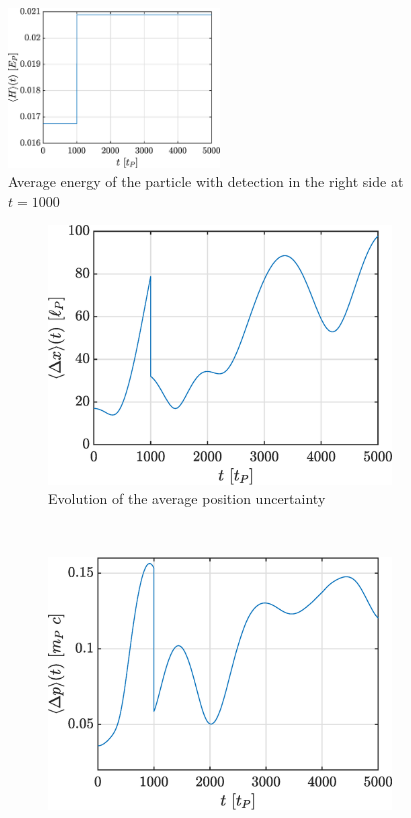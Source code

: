 \documentclass[a4paper,12pt,twoside]{article}
\begin{document}
\begin{figure}[h!]
\centering
 \includegraphics[width=0.5\textwidth]{graphs/iv_det_H.eps}
 \caption{Average energy of the particle with detection in the right side at $t=1000$}
 \label{fig:iv_det_H}
\end{figure}

\begin{figure}[h]
        \centering
        \begin{subfigure}[t]{0.45\textwidth}
          \includegraphics[width=\textwidth]{graphs/iv_det_delx.eps}
          \caption{Evolution of the average position uncertainty}
          \label{fig:iv_det_delx}
        \end{subfigure}
        ~
        \begin{subfigure}[t]{0.45\textwidth}
          \includegraphics[width=\textwidth]{graphs/iv_det_delp.eps}

\end{subfigure}
\end{figure}
\end{document}
